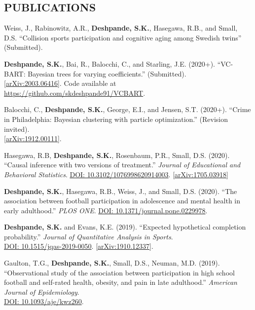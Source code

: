 \documentclass[margin]{res}
\begin{document}
\begin{resume}
\section{PUBLICATIONS}

Weiss, J., Rabinowitz, A.R., \textbf{Deshpande, S.K.}, Hasegawa, R.B., and Small, D.S. ``Collision sports participation and cognitive aging among Swedish twins'' (Submitted).

\textbf{Deshpande, S.K.}, Bai, R., Balocchi, C., and Starling, J.E. (2020+). ``VC-BART: Bayesian trees for varying coefficients.'' (Submitted). \\\href{https://arxiv.org/abs/2003.06416}{[arXiv:2003.06416]}. Code available at \url{https://github.com/skdeshpande91/VCBART}.

Balocchi, C., \textbf{Deshpande, S.K.}, George, E.I., and Jensen, S.T. (2020+). ``Crime in Philadelphia: Bayesian clustering with particle optimization.'' (Revision invited). \\ \href{https://arxiv.org/abs/1912.00111}{[arXiv:1912.00111]}.

Hasegawa, R.B, \textbf{Deshpande, S.K.}, Rosenbaum, P.R., Small, D.S. (2020). ``Causal inference with two versions of treatment.'' \textit{Journal of Educational and Behavioral Statistics}. \href{https://doi.org/10.3102/1076998620914003}{DOI: 10.3102/1076998620914003}. \href{https://arxiv.org/abs/1705.03918}{[arXiv:1705.03918]}

\textbf{Deshpande, S.K.}, Hasegawa, R.B., Weiss, J., and Small, D.S. (2020). ``The association between football participation in adolescence and mental health in early adulthood.'' \textit{PLOS ONE}.  \href{https://doi.org/10.1371/journal.pone.0229978}{DOI: 10.1371/journal.pone.0229978}.

\textbf{Deshpande, S.K.} and Evans, K.E. (2019). ``Expected hypothetical completion probability.'' \textit{Journal of Quantitative Analysis in Sports}. \\\href{https://doi.org/10.1515/jqas-2019-0050}{DOI: 10.1515/jqas-2019-0050}. \href{https://arxiv.org/abs/1910.12337}{[arXiv:1910.12337]}.

Gaulton, T.G., \textbf{Deshpande, S.K.}, Small, D.S., Neuman, M.D. (2019). ``Observational study of the association between participation in high school football and self-rated health, obesity, and pain in late adulthood.'' \textit{American Journal of Epidemiology}. \\ \href{https://doi.org/10.1093/aje/kwz260}{DOI: 10.1093/aje/kwz260}.


\end{resume}
\end{document}
